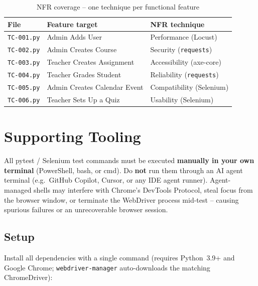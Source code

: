 \documentclass[twoside,final]{hcmut-report}
\begin{document}
\begin{table}[H]
\centering
\renewcommand{\arraystretch}{1.3}
\begin{tabularx}{\textwidth}{|l|X|l|}
\hline
\textbf{File} & \textbf{Feature target} & \textbf{NFR technique} \\ \hline
\texttt{TC-001.py} & Admin Adds User              & Performance (Locust) \\ \hline
\texttt{TC-002.py} & Admin Creates Course         & Security (\texttt{requests}) \\ \hline
\texttt{TC-003.py} & Teacher Creates Assignment   & Accessibility (axe-core) \\ \hline
\texttt{TC-004.py} & Teacher Grades Student       & Reliability (\texttt{requests}) \\ \hline
\texttt{TC-005.py} & Admin Creates Calendar Event & Compatibility (Selenium) \\ \hline
\texttt{TC-006.py} & Teacher Sets Up a Quiz       & Usability (Selenium) \\ \hline
\end{tabularx}
\caption{NFR coverage -- one technique per functional feature}
\end{table}

\section{Supporting Tooling}

\begin{tcolorbox}[colback=red!6!white, colframe=red!70!black, title=\textbf{Important -- Run Tests Manually}, fonttitle=\small\bfseries, left=4pt, right=4pt, top=4pt, bottom=4pt]
\small
All pytest / Selenium test commands must be executed \textbf{manually in your own terminal} (PowerShell, bash, or cmd).
Do \textbf{not} run them through an AI agent terminal (e.g.\ GitHub Copilot, Cursor, or any IDE agent runner).
Agent-managed shells may interfere with Chrome's DevTools Protocol, steal focus from the browser window, or terminate the WebDriver process mid-test -- causing spurious failures or an unrecoverable browser session.
\end{tcolorbox}

\subsection{Setup}
Install all dependencies with a single command (requires Python~3.9+ and Google Chrome; \texttt{webdriver-manager} auto-downloads the matching ChromeDriver):
\end{document}
